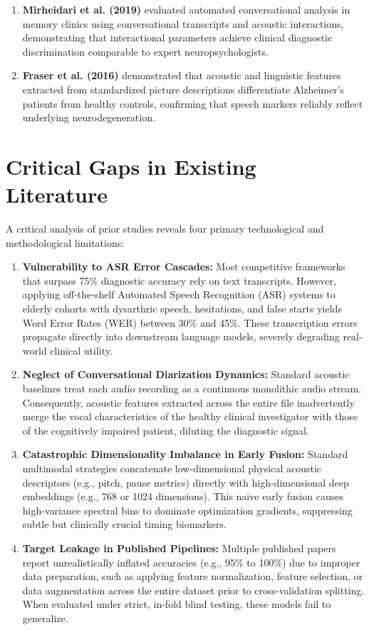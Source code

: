 \documentclass[conference]{IEEEtran}
\begin{document}
\begin{enumerate}
    \item \textbf{Mirheidari et al. (2019)} \cite{mirheidari2019dementia} evaluated automated conversational analysis in memory clinics using conversational transcripts and acoustic interactions, demonstrating that interactional parameters achieve clinical diagnostic discrimination comparable to expert neuropsychologists.
    
    \item \textbf{Fraser et al. (2016)} \cite{robin2020acoustic} demonstrated that acoustic and linguistic features extracted from standardized picture descriptions differentiate Alzheimer's patients from healthy controls, confirming that speech markers reliably reflect underlying neurodegeneration.
\end{enumerate}

\section{Critical Gaps in Existing Literature}
A critical analysis of prior studies reveals four primary technological and methodological limitations:
\begin{enumerate}
    \item \textbf{Vulnerability to ASR Error Cascades:} Most competitive frameworks that surpass 75\% diagnostic accuracy rely on text transcripts. However, applying off-the-shelf Automated Speech Recognition (ASR) systems to elderly cohorts with dysarthric speech, hesitations, and false starts yields Word Error Rates (WER) between 30\% and 45\%. These transcription errors propagate directly into downstream language models, severely degrading real-world clinical utility.
    \item \textbf{Neglect of Conversational Diarization Dynamics:} Standard acoustic baselines treat each audio recording as a continuous monolithic audio stream. Consequently, acoustic features extracted across the entire file inadvertently merge the vocal characteristics of the healthy clinical investigator with those of the cognitively impaired patient, diluting the diagnostic signal.
    \item \textbf{Catastrophic Dimensionality Imbalance in Early Fusion:} Standard multimodal strategies concatenate low-dimensional physical acoustic descriptors (e.g., pitch, pause metrics) directly with high-dimensional deep embeddings (e.g., 768 or 1024 dimensions). This naive early fusion causes high-variance spectral bins to dominate optimization gradients, suppressing subtle but clinically crucial timing biomarkers.
    \item \textbf{Target Leakage in Published Pipelines:} Multiple published papers report unrealistically inflated accuracies (e.g., 95\% to 100\%) due to improper data preparation, such as applying feature normalization, feature selection, or data augmentation across the entire dataset prior to cross-validation splitting. When evaluated under strict, in-fold blind testing, these models fail to generalize.
\end{enumerate}
\end{document}
